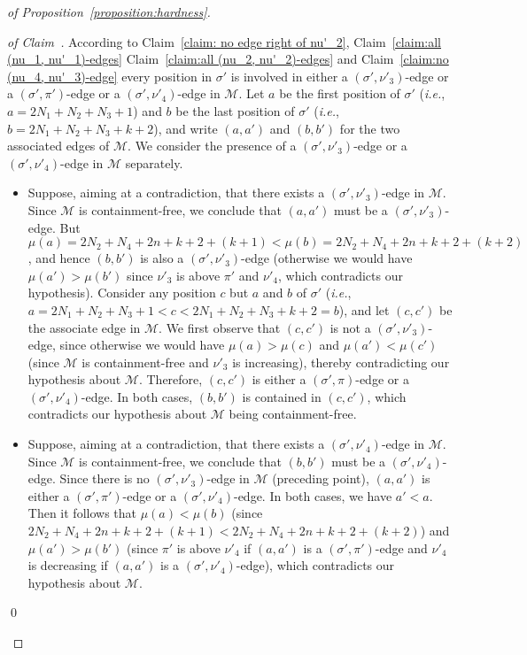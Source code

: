 \documentclass[a4paper]{llncs}
\begin{document}
\begin{proof}[of Proposition~\ref{proposition:hardness}]
  \begin{proof}[of Claim~\label{claim:no (sigma', nu'_3)-edge}]
    According to
    Claim~\ref{claim: no edge right of nu'_2},
    Claim~\ref{claim:all (nu_1, nu'_1)-edges}
    Claim~\ref{claim:all (nu_2, nu'_2)-edges} and
    Claim~\ref{claim:no (nu_4, nu'_3)-edge}
    every position in $\sigma'$ is involved in
    either a $(\sigma', \nu'_3)$-edge
    or a $(\sigma', \pi')$-edge
    or a $(\sigma', \nu'_4)$-edge
    in $\mathcal{M}$.
    Let $a$ be the first position of $\sigma'$
    (\emph{i.e.}, $a = 2N_1 + N_2 + N_3 + 1$)
    and
    $b$ be the last position of $\sigma'$
    (\emph{i.e.}, $b = 2N_1 + N_2 + N_3 + k + 2$),
    and write $(a, a')$ and $(b, b')$ for the two associated edges of $\mathcal{M}$.
    We consider the presence of a $(\sigma', \nu'_3)$-edge
    or a $(\sigma', \nu'_4)$-edge in $\mathcal{M}$ separately.
    \begin{itemize}
      \item
      Suppose, aiming at a contradiction, that there exists
      a $(\sigma', \nu'_3)$-edge in $\mathcal{M}$.
      Since $\mathcal{M}$ is containment-free, we conclude that
      $(a, a')$ must be a $(\sigma', \nu'_3)$-edge.
      But $\mu(a) = 2N_2 + N_4 + 2n + k + 2 + (k+1) <
      \mu(b) = 2N_2 + N_4 + 2n + k + 2 + (k+2)$, and hence
      $(b, b')$ is also a $(\sigma', \nu'_3)$-edge
      (otherwise we would have $\mu(a') > \mu(b')$ since
      $\nu'_3$ is above $\pi'$ and $\nu'_4$,
      which contradicts our hypothesis).
      Consider any position $c$ but $a$ and $b$ of $\sigma'$
      (\emph{i.e.},
      $a = 2N_1 + N_2 + N_3 + 1 < c < 2N_1 + N_2 + N_3 + k + 2 = b$),
      and let $(c, c')$ be the associate edge in $\mathcal{M}$.
      We first observe that $(c, c')$ is not a $(\sigma', \nu'_3)$-edge,
      since otherwise we would have
      $\mu(a) > \mu(c)$ and $\mu(a') < \mu(c')$
      (since $\mathcal{M}$ is containment-free and $\nu'_3$ is increasing),
      thereby contradicting our hypothesis about $\mathcal{M}$.
      Therefore, $(c, c')$ is either a $(\sigma', \pi)$-edge or a $(\sigma', \nu'_4)$-edge.
      In both cases, $(b, b')$ is contained in $(c, c')$,
      which contradicts our hypothesis about $\mathcal{M}$ being containment-free.
      \item
      Suppose, aiming at a contradiction, that there exists
      a $(\sigma', \nu'_4)$-edge in $\mathcal{M}$.
      Since $\mathcal{M}$ is containment-free, we conclude that
      $(b, b')$ must be a $(\sigma', \nu'_4)$-edge.
      Since there is no $(\sigma', \nu'_3)$-edge in $\mathcal{M}$
      (preceding point),
      $(a, a')$ is either a
      $(\sigma', \pi')$-edge or a $(\sigma', \nu'_4)$-edge.
      In both cases, we have $a' < a$.
      Then it follows that
      $\mu(a) < \mu(b)$
      (since $2N_2 + N_4 + 2n + k + 2 + (k+1) < 2N_2 + N_4 + 2n + k + 2 + (k+2)$)
      and
      $\mu(a') > \mu(b')$ (since $\pi'$ is above $\nu'_4$ if $(a, a')$ is
      a $(\sigma', \pi')$-edge and
      $\nu'_4$ is decreasing if $(a, a')$ is
      a $(\sigma', \nu'_4)$-edge),
      which contradicts our hypothesis about $\mathcal{M}$.
    \end{itemize}
    \qed
  \end{proof}


\end{proof}
\end{document}
